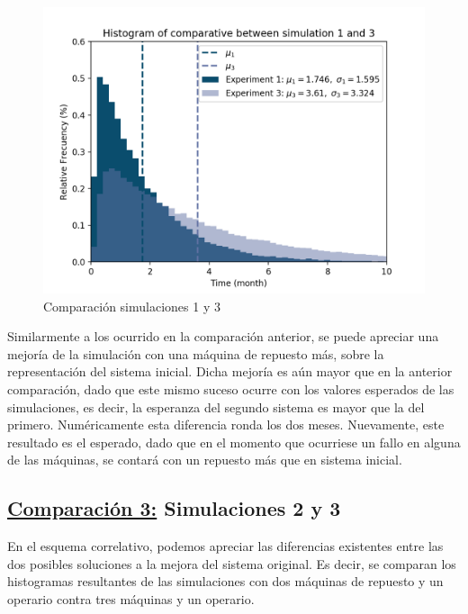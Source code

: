     \begin{figure}[H]
      \includegraphics[scale=1.1]{graphics/Comparative_graphic_2.png}
      \caption{Comparación simulaciones 1 y 3}
      \centering
    \end{figure}

    \vspace{5mm}
    \par Similarmente a los ocurrido en la comparación anterior, se puede apreciar una mejoría de la simulación con una
    máquina de repuesto más, sobre la representación del sistema inicial. Dicha mejoría es aún mayor que en la anterior
    comparación, dado que este mismo suceso ocurre con los valores esperados de las simulaciones, es decir, la
    esperanza del segundo sistema es mayor que la del primero. Numéricamente esta diferencia ronda los dos meses.
    Nuevamente, este resultado es el esperado, dado que en el momento que ocurriese un fallo en alguna de las máquinas,
    se contará con un repuesto más que en sistema inicial.

  \pagebreak
  \subsection{\underline{Comparación 3:} Simulaciones 2 y 3}

    \par En el esquema correlativo, podemos apreciar las diferencias existentes entre las dos posibles soluciones a la
    mejora del sistema original. Es decir, se comparan los histogramas resultantes de las
    simulaciones con dos máquinas de repuesto y un operario contra tres máquinas y un operario.

